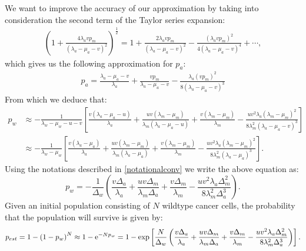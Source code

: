 \documentclass[11pt,a4paper]{article}
\newcommand{\e}{{\rm e}}
\begin{document}
We want to improve the accuracy of our approximation by taking into consideration the second term of the Taylor series expansion:
\begin{align*}
\left(1+\frac{4\lambda_avp_m}{\left(\lambda_a-\mu_a-v\right)^2}\right)^{\frac{1}{2}}=1+\frac{2\lambda_avp_m}{\left(\lambda_a-\mu_a-v\right)^2}-\frac{\left(\lambda_avp_m\right)^2}{4\left(\lambda_a-\mu_a-v\right)^4}+\cdots,
\end{align*}
which gives us the following approximation for $p_a$:
\begin{align}
p_a=\frac{\lambda_a-\mu_a-v}{\lambda_a}+\frac{vp_m}{\lambda_a-\mu_a-v}-\frac{\lambda_a\left(vp_m\right)^2}{8\left(\lambda_a-\mu_a-v\right)^3}
\end{align}
From which we deduce that:
\begin{align}\nonumber
p_w&\approx-\frac{1}{\lambda_w-\mu_w-u-v}\left[\frac{v\left(\lambda_a-\mu_a-u\right)}{\lambda_a}+\frac{uv\left(\lambda_m-\mu_m\right)}{\lambda_m\left(\lambda_a-\mu_a-u\right)}+\frac{v\left(\lambda_m-\mu_m\right)}{\lambda_m}-\frac{uv^2\lambda_a\left(\lambda_m-\mu_m\right)^2}{8\lambda_m^2\left(\lambda_a-\mu_a-v\right)^3}\right]\\ \label{survprobw3}
&\approx-\frac{1}{\lambda_w-\mu_w}\left[\frac{v\left(\lambda_a-\mu_a\right)}{\lambda_a}+\frac{uv\left(\lambda_m-\mu_m\right)}{\lambda_m\left(\lambda_a-\mu_a\right)}+\frac{v\left(\lambda_m-\mu_m\right)}{\lambda_m}-\frac{uv^2\lambda_a\left(\lambda_m-\mu_m\right)^2}{8\lambda_m^2\left(\lambda_a-\mu_a\right)^3}\right].
\end{align}
Using the notations described in \eqref{notationalconv} we write the above equation as:
\begin{equation}\label{survprobwapproxcorrected}
p_w=-\frac{1}{\Delta_w}\left(\frac{v\Delta_a}{\lambda_a}+\frac{uv\Delta_m}{\lambda_m\Delta_a}+\frac{v\Delta_m}{\lambda_m}-\frac{uv^2\lambda_a\Delta_m^2}{8\lambda_m^2\Delta_a^3}\right).
\end{equation}
Given an initial population consisting of $N$ wildtype cancer cells, the probability that the population will survive is given by: 
\begin{align}
p_{est}=1-\left(1-p_w\right)^N\approx 1-\e^{-Np_w}=1-\exp\left[\frac{N}{\Delta_w}\left(\frac{v\Delta_a}{\lambda_a}+\frac{uv\Delta_m}{\lambda_m\Delta_a}+\frac{v\Delta_m}{\lambda_m}-\frac{uv^2\lambda_a\Delta_m^2}{8\lambda_m^2\Delta_a^3}\right)\right].
\end{align}
\end{document}
